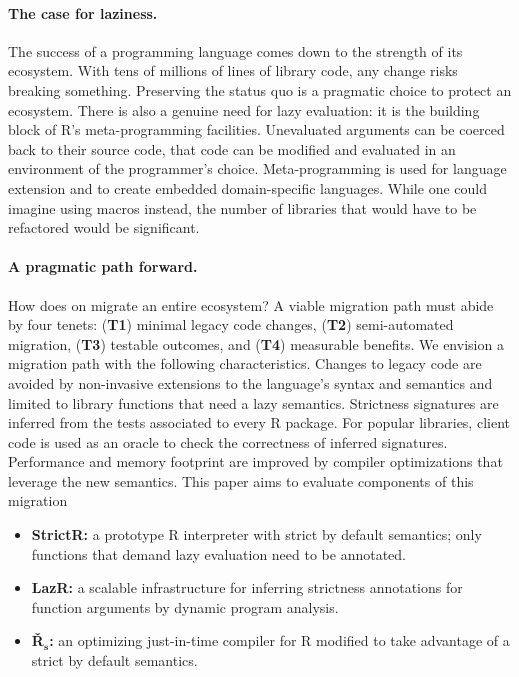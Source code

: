 \documentclass[review,creen,acmsmall]{acmart}
\begin{document}
\paragraph{The case for laziness.} The success of a programming language
comes down to the strength of its ecosystem. With tens of millions of lines of
library code, any change risks breaking something. Preserving the status quo is
a pragmatic choice to protect an ecosystem. There is also a genuine need for
lazy evaluation: it is the building block of R's meta-programming facilities.
Unevaluated arguments can be coerced back to their source code, that code can be
modified and evaluated in an environment of the programmer's choice.
Meta-programming is used for language extension and to create embedded
domain-specific languages. While one could imagine using macros instead, the
number of libraries that would have to be refactored would be significant.

\paragraph{A pragmatic path forward.} How does on migrate an entire ecosystem?
A viable migration path must abide by four tenets: ({\bf T1}) minimal legacy
code changes, ({\bf T2}) semi-automated migration, ({\bf T3}) testable outcomes,
and ({\bf T4}) measurable benefits. We envision a migration path with the
following characteristics. Changes to legacy code are avoided by non-invasive
extensions to the language's syntax and semantics and limited to library
functions that need a lazy semantics. Strictness signatures are inferred from
the tests associated to every R package. For popular libraries, client code is
used as an oracle to check the correctness of inferred signatures. Performance
and memory footprint are improved by compiler optimizations that leverage the
new semantics. This paper aims to evaluate components of this migration

\newcommand{\rshstrict}{{\sf {\v R}$_{\mathsf s}$}}
\newcommand{\brshstrict}{{\bf {\v R}$_{\mathbf s}$}}

\begin{itemize}[---]
\item {\bf StrictR:} a prototype R interpreter with strict by default
  semantics; only functions that demand lazy evaluation need to be annotated.
\item {\bf LazR:} a scalable infrastructure for inferring strictness annotations
  for function arguments by dynamic program analysis.
\item {\bf \brshstrict:} an optimizing just-in-time compiler for R modified to
  take advantage of a strict by default semantics.
\end{itemize}
\end{document}
